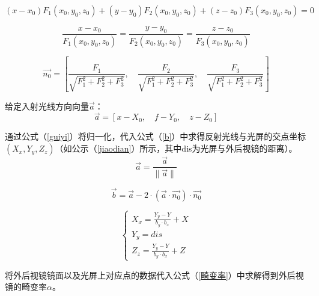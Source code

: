 \documentclass[withoutpreface,bwprint]{cumcmthesis} %
\begin{document}
\begin{equation}
\label{qiepingmian}
	(x - x_0)F_1(x_0,y_0,z_0) + (y - y_0)F_2(x_0,y_0,z_0) + (z - z_0)F_3(x_0,y_0,z_0) = 0
\end{equation}

\begin{equation}
\label{faxian}
	\frac{x - x_0}{F_1(x_0,y_0,z_0)} = \frac{y - y_0}{F_2(x_0,y_0,z_0)} = \frac{z - z_0}{F_3(x_0,y_0,z_0)} 
\end{equation}

\begin{equation}
\label{faxiangliang}
	\vec{n_0} = \left[\frac{F_1}{\sqrt{F_1^2+F_2^2+F_3^2}},\quad \frac{F_2}{\sqrt{F_1^2+F_2^2+F_3^2}},\quad \frac{F_3}{\sqrt{F_1^2+F_2^2+F_3^2}}\right]
\end{equation}
\par 给定入射光线方向向量$\vec{a}$：
\begin{equation}
	\vec{a} = [x - X_0,\quad f - Y_0, \quad z - Z_0 ]
\end{equation}
\par 通过公式（\ref{guiyi}）将归一化，代入公式（\ref{b}）中求得反射光线与光屏的交点坐标$(X_x,Y_y,Z_z)$（如公示（\ref{jiaodian}）所示，其中dis为光屏与外后视镜的距离）。
\begin{equation}
\label{guiyi}
	\vec{a} = \frac{\vec{a}}{\|\vec{a}\|}   
\end{equation}

\begin{equation}
\label{b}
	\vec{b} = \vec{a} - 2 \cdot (\vec{a} \cdot \vec{n_0}) \cdot \vec{n_0}
\end{equation}

\begin{equation}
\label{jiaodian}
	\begin{cases}
		X_x = \frac{Y_y - Y}{b_y \cdot b_x} + X \\
		Y_y = dis \\
		Z_z = \frac{Y_y - Y}{b_y \cdot b_x} + Z
	\end{cases}
\end{equation}

\par 将外后视镜镜面以及光屏上对应点的数据代入公式（\ref{畸变率}）中求解得到外后视镜的畸变率$\alpha$。
\end{document}
